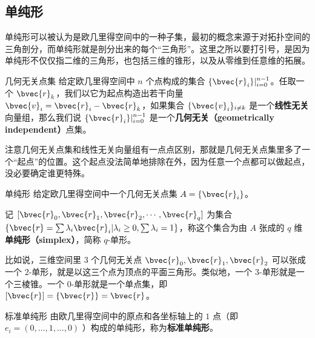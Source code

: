
\begin{issues}
\end{issues}



\subsection{单纯形}

单纯形可以被认为是欧几里得空间中的一种子集，最初的概念来源于对拓扑空间的三角剖分，而单纯形就是剖分出来的每个“三角形”。这里之所以要打引号，是因为单纯形不仅仅指二维的三角形，也包括三维的锥形，以及从零维到任意维的拓展。

\begin{definition}{几何无关点集}
给定欧几里得空间中 $n$ 个点构成的集合 $\{\bvec{r}_i\}|_{i=0}^{n-1}$。任取一个 $\bvec{r}_k$，我们以它为起点构造出若干向量 $\bvec{v}_i=\bvec{r}_i-\bvec{r}_k$，如果集合 $\{\bvec{v}_i\}_{i\not= k}$ 是一个\textbf{线性无关}向量组，那么我们说 $\{\bvec{r}_i\}|_{i=0}^{n-1}$ 是一个\textbf{几何无关（geometrically independent）}点集。
\end{definition}

注意几何无关点集和线性无关向量组有一点点区别，那就是几何无关点集里多了一个“起点”的位置。这个起点没法简单地排除在外，因为任意一个点都可以做起点，没必要确定谁更特殊。

\begin{definition}{单纯形}
给定欧几里得空间中一个几何无关点集 $A=\{\bvec{r}_i\}$。

记 $[\bvec{r}_0, \bvec{r}_1, \bvec{r}_2, \cdots, \bvec{r}_q]$ 为集合 $\{\bvec{r}=\sum\lambda_i\bvec{r}_i|\lambda_i\geq 0, \sum\lambda_i=1\}$，称这个集合为由 $A$ 张成的 $q$ 维\textbf{单纯形（simplex）}，简称 $q$-单形。

\end{definition}

比如说，三维空间里 $3$ 个几何无关点 $\bvec{r}_0, \bvec{r}_1, \bvec{r}_2$ 可以张成一个 $2$-单形，就是以这三个点为顶点的平面三角形。类似地，一个 $3$-单形就是一个三棱锥。一个 $0$-单形就是一个单点集，即 $[\bvec{r}]=\{\bvec{r}\}=\bvec{r}$。


\begin{definition}{标准单纯形}
由欧几里得空间中的原点和各坐标轴上的 $1$ 点（即 $e_i = (0, \dots, 1, \dots, 0)$ ）构成的单纯形，称为\textbf{标准单纯形}。
\end{definition}

